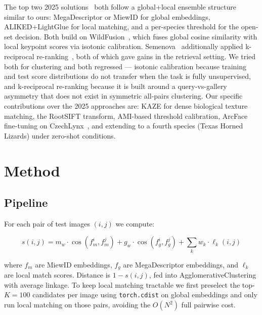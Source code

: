 \documentclass[]{ceurart}
\begin{document}
The top two 2025 solutions~\cite{pakhomov2025animalclef,semenova2025animalclef}
both follow a global+local ensemble structure similar to ours: MegaDescriptor or
MiewID for global embeddings, ALIKED+LightGlue for local matching, and a
per-species threshold for the open-set decision. Both build on
WildFusion~\cite{cermak2024wildfusion}, which fuses global cosine similarity
with local keypoint scores via isotonic calibration. Semenova~\cite{semenova2025animalclef}
additionally applied k-reciprocal re-ranking~\cite{zhong2017reranking}, both of
which gave gains in the retrieval setting. We tried both for clustering and both
regressed --- isotonic calibration because training and test score distributions
do not transfer when the task is fully unsupervised, and k-reciprocal re-ranking
because it is built around a query-vs-gallery asymmetry that does not exist in
symmetric all-pairs clustering.
Our specific contributions over the 2025 approaches are: KAZE for dense
biological texture matching, the RootSIFT transform, AMI-based threshold
calibration, ArcFace fine-tuning on CzechLynx~\cite{picek2025czechlynx}, and
extending to a fourth species (Texas Horned Lizards) under zero-shot conditions.

\section{Method}

\subsection{Pipeline}

For each pair of test images $(i, j)$ we compute:

\begin{equation}
  s(i,j) = m_w \cdot \cos(f_m^i, f_m^j)
          + g_w \cdot \cos(f_g^i, f_g^j)
          + \sum_{k} w_k \cdot \ell_k(i,j)
\end{equation}

where $f_m$ are MiewID embeddings, $f_g$ are MegaDescriptor embeddings, and
$\ell_k$ are local match scores. Distance is $1 - s(i,j)$, fed into
AgglomerativeClustering with average linkage. To keep local matching tractable
we first preselect the top-$K=100$ candidates per image using
\texttt{torch.cdist} on global embeddings and only run local matching on those
pairs, avoiding the $O(N^2)$ full pairwise cost.
\end{document}
